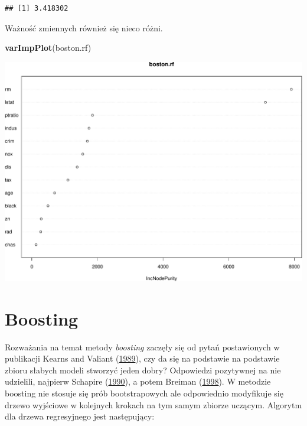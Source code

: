 \documentclass[]{book}
\newenvironment{Shaded}{\begin{snugshade}}{\end{snugshade}}
\newcommand{\DataTypeTok}[1]{\textcolor[rgb]{0.13,0.29,0.53}{#1}}
\newcommand{\KeywordTok}[1]{\textcolor[rgb]{0.13,0.29,0.53}{\textbf{#1}}}
\newcommand{\NormalTok}[1]{#1}
\newcommand{\OperatorTok}[1]{\textcolor[rgb]{0.81,0.36,0.00}{\textbf{#1}}}
\newcommand{\StringTok}[1]{\textcolor[rgb]{0.31,0.60,0.02}{#1}}
\theoremstyle{plain}
\theoremstyle{definition}
\theoremstyle{definition}
\theoremstyle{definition}
\theoremstyle{definition}
\theoremstyle{remark}
\begin{document}
\begin{Shaded}
\end{Shaded}

\begin{verbatim}
## [1] 3.418302
\end{verbatim}

Ważność zmiennych również się nieco różni.

\begin{Shaded}
\begin{Highlighting}[]
\KeywordTok{varImpPlot}\NormalTok{(boston.rf)}
\end{Highlighting}
\end{Shaded}

\includegraphics{EksploracjaDanych_files/figure-latex/unnamed-chunk-41-1.pdf}

\hypertarget{boosting}{%
\section{Boosting}\label{boosting}}

Rozważania na temat metody \emph{boosting} zaczęły się od pytań postawionych w publikacji Kearns and Valiant (\protect\hyperlink{ref-kearns1989}{1989}), czy da się na podstawie na podstawie zbioru słabych modeli stworzyć jeden dobry? Odpowiedzi pozytywnej na nie udzielili, najpierw Schapire (\protect\hyperlink{ref-schapire1990}{1990}), a potem Breiman (\protect\hyperlink{ref-breiman1998}{1998}). W metodzie boosting nie stosuje się prób bootstrapowych ale odpowiednio modyfikuje się drzewo wyjściowe w kolejnych krokach na tym samym zbiorze uczącym. Algorytm dla drzewa regresyjnego jest następujący:
\end{document}
